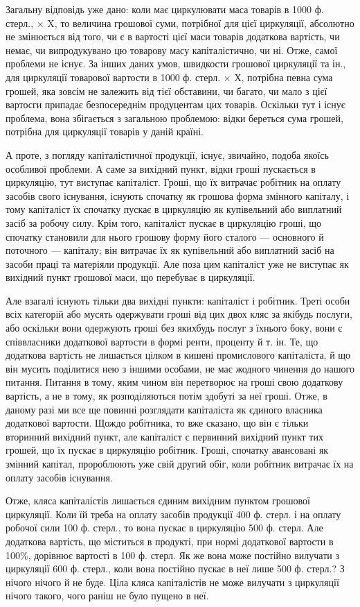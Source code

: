 Загальну відповідь уже дано: коли має циркулювати маса товарів в
1000 ф. стерл., × X, то величина грошової суми, потрібної для цієї циркуляції,
абсолютно не змінюється від того, чи є в вартості цієї маси товарів
додаткова вартість, чи немає, чи випродукувано цю товарову масу
капіталістично, чи ні. Отже, самої проблеми не існує. За інших
даних умов, швидкости грошової циркуляції та ін., для циркуляції товарової
вартости в 1000 ф. стерл. × Х, потрібна певна сума грошей, яка
зовсім не залежить від тієї обставини, чи багато, чи мало з цієї вартосги
припадає безпосереднім продуцентам цих товарів. Оскільки тут і існує
проблема, вона збігається з загальною проблемою: відки береться сума
грошей, потрібна для циркуляції товарів у даній країні.

А проте, з погляду капіталістичної продукції, існує, звичайно, подоба
якоїсь особливої проблеми. А саме за вихідний пункт, відки гроші пускається
в циркуляцію, тут виступає капіталіст. Гроші, що їх витрачає
робітник на оплату засобів свого існування, існують спочатку як грошова
форма змінного капіталу, і тому капіталіст їх спочатку пускає в
циркуляцію як купівельний або виплатний засіб за робочу силу. Крім
того, капіталіст пускає в циркуляцію гроші, що спочатку становили для
нього грошову форму його сталого — основного й поточного — капіталу;
він витрачає їх як купівельний або виплатний засіб на засоби праці та
матеріяли продукції. Але поза цим капіталіст уже не виступає як вихідний
пункт грошової маси, що перебуває в циркуляції.

Але взагалі існують тільки два вихідні пункти: капіталіст і робітник.
Треті особи всіх категорій або мусять одержувати гроші від цих двох
кляс за якібудь послуги, або оскільки вони одержують гроші без якихбудь
послуг з їхнього боку, вони є співвласники додаткової вартости в
формі ренти, проценту й т. ін. Те, що додаткова вартість не лишається
цілком в кишені промислового капіталіста, й що він мусить поділитися
нею з іншими особами, не має жодного чинення до нашого питання.
Питання в тому, яким чином він перетворює на гроші свою додаткову
вартість, а не в тому, як розподіляються потім здобуті за неї гроші.
Отже, в даному разі ми все ще повинні розглядати капіталіста як єдиного
власника додаткової вартости. Щождо робітника, то вже сказано, що
він є тільки вторинний вихідний пункт, але капіталіст є первинний
вихідний пункт тих грошей, що їх пускає в циркуляцію робітник. Гроші,
спочатку авансовані як змінний капітал, пророблюють уже свій другий
обіг, коли робітник витрачає їх на оплату засобів існування.

Отже, кляса капіталістів лишається єдиним вихідним пунктом грошової
циркуляції. Коли їй треба на оплату засобів продукції 400 ф. стерл.
і на оплату робочої сили 100 ф. стерл., то вона пускає в циркуляцію
500 ф. стерл. Але додаткова вартість, що міститься в продукті, при нормі
додаткової вартости в 100\%, дорівнює вартості в 100 ф. стерл. Як
же вона може постійно вилучати з циркуляції 600 ф. стерл., коли
вона постійно пускає в неї лише 500 ф. стерл.? З нічого нічого й не
буде. Ціла кляса капіталістів не може вилучати з циркуляції нічого такого,
чого раніш не було пущено в неї.
